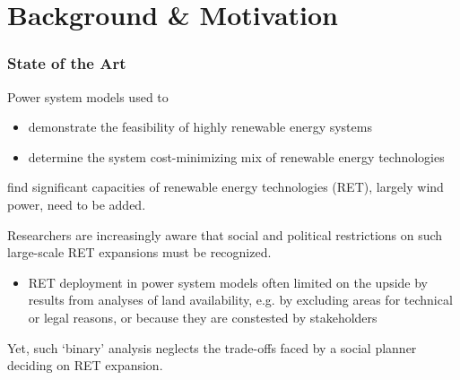\documentclass[aspectratio=1610, xcolor=dvipsnames,handout]{beamer} %
\begin{document}
    \section{Background \& Motivation}\label{sec:background}
    \begin{frame}
        \frametitle{State of the Art}
        Power system models used to
        \begin{itemize}
            \item demonstrate the feasibility of highly renewable energy systems
            \item determine the system cost-minimizing mix of renewable energy technologies
        \end{itemize}
        find significant capacities of renewable energy technologies (RET), largely wind power, need to be added.
        \medskip

        Researchers are increasingly aware that social and political restrictions on such large-scale RET expansions must be
        recognized.
        \begin{itemize}
            \item RET deployment in power system models often limited on the upside by results from analyses of land
            availability, e.g. by excluding areas for technical or legal reasons, or because they are constested by stakeholders
        \end{itemize}
        \medskip

        Yet, such `binary' analysis neglects the trade-offs faced by a social planner deciding on RET expansion.
    \end{frame}
\end{document}
